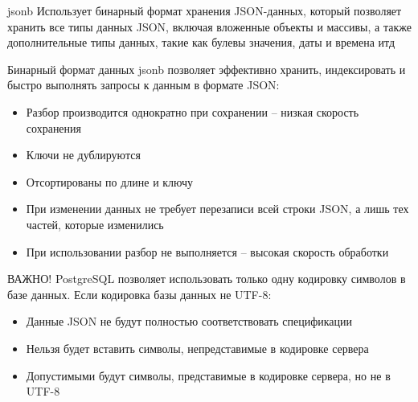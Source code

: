 \documentclass[12pt]{article}
\begin{document}
\begin{Remark}{jsonb}
    Использует бинарный формат хранения JSON-данных, который позволяет хранить все типы данных JSON, включая вложенные объекты и массивы, а также дополнительные типы данных, такие как булевы значения, даты и времена итд 

    Бинарный формат данных jsonb позволяет эффективно хранить, индексировать и быстро выполнять запросы к данным в формате JSON:

    \begin{itemize}
        \item Разбор производится однократно при сохранении -- низкая скорость сохранения 
        \item Ключи не дублируются 
        \item Отсортированы по длине и ключу 
        \item При изменении данных не требует перезаписи всей строки JSON, а лишь тех частей, которые изменились 
        \item При использовании разбор не выполняется -- высокая скорость обработки 
    \end{itemize}
\end{Remark}

\begin{Remark}{ВАЖНО!}
    PostgreSQL позволяет использовать только одну кодировку символов в базе данных. Если кодировка базы данных не UTF-8:

    \begin{itemize}
        \item Данные JSON не будут полностью соответствовать спецификации
        \item Нельзя будет вставить символы, непредставимые в кодировке сервера 
        \item Допустимыми будут символы, представимые в кодировке сервера, но не в UTF-8
    \end{itemize}
\end{Remark}
\end{document}
